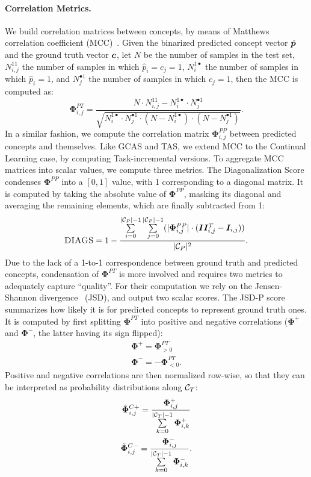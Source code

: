 \paragraph{Correlation Metrics.} We build correlation matrices between concepts, by means of {\sc\small Matthews correlation coefficient} (MCC)~\cite{matthews1975comparison}. Given the binarized predicted concept vector $\hat{{\bm{p}}}$ and the ground truth vector ${\bm{c}}$, let $N$ be the number of samples in the test set, $N^{11}_{i,j}$ the number of samples in which $\hat p_i = c_j = 1$, $N^{1\bullet}_{i}$ the number of samples in which $\hat p_i = 1$, and $N^{\bullet1}_{j}$ the number of samples in which $c_j = 1$, then the MCC is computed as:
$$\mathbf{\Phi}^{PT}_{i,j} = \frac{N \cdot N^{11}_{i,j} - N^{1\bullet}_i \cdot N^{\bullet1}_j}{\sqrt{N^{1\bullet}_i \cdot N^{\bullet1}_j \cdot (N - N^{1\bullet}_i) \cdot (N - N^{\bullet1}_j)}}.$$
In a similar fashion, we compute the correlation matrix $\mathbf{\Phi}^{PP}_{i,j}$ between predicted concepts and themselves.
Like GCAS and TAS, we extend MCC to the Continual Learning case, by computing Task-incremental versions.
To aggregate MCC matrices into scalar values, we compute three metrics.
The {\sc\small Diagonalization Score} condenses $\mathbf{\Phi}^{PP}$ into a $[0, 1]$ value, with 1 corresponding to a diagonal matrix. It is computed by taking the absolute value of $\mathbf{\Phi}^{PP}$, masking its diagonal and averaging the remaining elements, which are finally subtracted from 1:
$$
\textsc{DIAGS} = 1 - \frac{\sum\limits_{i = 0}^{|{\mathcal{C}}_P|-1}\sum\limits_{j = 0}^{|{\mathcal{C}}_P|-1} (|\mathbf{\Phi}^{PP}_{i,j}| \cdot ({\bm{I}}{\bm{I}}^T_{i,j} - {\bm{I}}_{i,j}))}{|{\mathcal{C}}_P|^2}.
$$
Due to the lack of a 1-to-1 correspondence between ground truth and predicted concepts, condensation of $\mathbf{\Phi}^{PT}$ is more involved and requires two metrics to adequately capture ``quality''. For their computation we rely on the {\sc\small Jensen-Shannon divergence}~\cite{menendez1997jensen} (JSD), and output two scalar scores. 
The \textsc{JSD-P} score summarizes how likely it is for predicted concepts to represent ground truth ones.
It is computed by first splitting $\mathbf{\Phi}^{PT}$ into positive and negative correlations ($\mathbf{\Phi}^{+}$ and $\mathbf{\Phi}^{-}$, the latter having its sign flipped):
\begin{gather*}
	\mathbf{\Phi}^{+} = \mathbf{\Phi}^{PT}_{>0}\\
	\mathbf{\Phi}^{-} = -\mathbf{\Phi}^{PT}_{<0}.
\end{gather*}
Positive and negative correlations are then normalized row-wise, so that they can be interpreted as probability distributions along ${\mathcal{C}}_T$:
\begin{gather*}
	\tilde{\mathbf{\Phi}}^{C+}_{i,j} = \frac{\mathbf{\Phi}^{+}_{i,j}}{\sum\limits_{k = 0}^{|{\mathcal{C}}_T|-1} \mathbf{\Phi}^{+}_{i,k}}\\
	\tilde{\mathbf{\Phi}}^{C-}_{i,j} = \frac{\mathbf{\Phi}^{-}_{i,j}}{\sum\limits_{k = 0}^{|{\mathcal{C}}_T|-1} \mathbf{\Phi}^{-}_{i,k}}.
\end{gather*}

